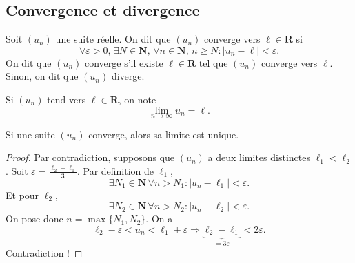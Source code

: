 \subsection{Convergence et divergence}
\begin{definition}
Soit $(u_{n})$ une suite réelle. On dit que $(u_{n})$ converge vers $\ell \in \mathbf{R}$ si
$$
\forall\varepsilon>0,\,\exists N\in \mathbf{N},\,\forall n\in \mathbf{N},\,n\ge N:|u_{n}-\ell|<\varepsilon.
$$
On dit que $(u_{n})$ converge s'il existe $\ell \in \mathbf{R}$ tel que $(u_{n})$ converge vers $\ell$. Sinon, on dit que $(u_{n})$ diverge.
\end{definition}
\begin{notation}
Si $(u_{n})$ tend vers $\ell \in \mathbf{R}$, on note
$$
\lim_{ n \to \infty } u_{n}=\ell.
$$
\end{notation}
\begin{proposition}
Si une suite $(u_{n})$ converge, alors sa limite est unique.
\end{proposition}
\begin{proof}
Par contradiction, supposons que $(u_{n})$ a deux limites distinctes $\ell_{1}<\ell_2$. Soit $\varepsilon=\frac{\ell_{2}-\ell_{1}}{3}$. Par definition de $\ell_1$, 
$$
\exists N_{1}\in \mathbf{N}\,\forall n>N_{1}:|u_{n}-\ell_{1}|<\varepsilon.
$$
Et pour $\ell_{2}$,
$$
\exists N_{2}\in \mathbf{N}\,\forall n>N_{2}:|u_{n}-\ell_{2}|<\varepsilon.
$$
On pose donc $n=\max\{ N_{1},N_{2} \}$. On a 
$$
\ell_{2}-\varepsilon <u_{n}<\ell_{1}+\varepsilon \Rightarrow \underbrace{ \ell_{2}-\ell_{1} }_{ =3\varepsilon }<2\varepsilon.
$$
Contradiction !
\end{proof}